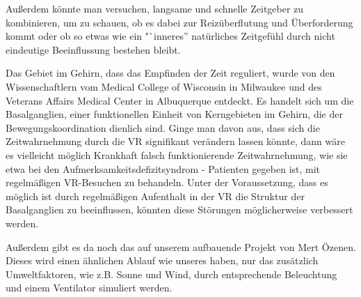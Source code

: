 \documentclass{Bericht}
\begin{document}
Außerdem könnte man versuchen, langsame und schnelle Zeitgeber zu  kombinieren, um zu schauen, ob es dabei zur Reizüberflutung und Überforderung kommt oder ob so etwas wie ein "`inneres'' natürliches Zeitgefühl durch nicht eindeutige Beeinflussung bestehen bleibt.

Das Gebiet im Gehirn, dass das Empfinden der Zeit reguliert, wurde von den Wissenschaftlern vom Medical College of Wisconsin in Milwaukee und des Veterans Affairs Medical Center in Albuquerque entdeckt. Es handelt sich um die Basalganglien, einer funktionellen Einheit von Kerngebieten im Gehirn, die der Bewegungskoordination dienlich sind. Ginge man davon aus, dass sich die Zeitwahrnehmung durch die VR signifikant verändern lassen könnte, dann wäre es vielleicht möglich Krankhaft falsch funktionierende Zeitwahrnehmung, wie sie etwa bei den Aufmerksamkeitsdefizitsyndrom - Patienten gegeben ist, mit regelmäßigen VR-Besuchen zu behandeln. Unter der Voraussetzung, dass es  möglich ist durch regelmäßigen Aufenthalt in der VR die Struktur der Basalganglien zu beeinflussen, könnten diese Störungen möglicherweise verbessert werden.

Außerdem gibt es da noch das auf unserem aufbauende Projekt von Mert Özenen. Dieses wird einen ähnlichen Ablauf wie unseres haben, nur das zusätzlich Umweltfaktoren, wie z.B. Sonne und Wind, durch entsprechende Beleuchtung und einem Ventilator simuliert werden.



\end{document}
